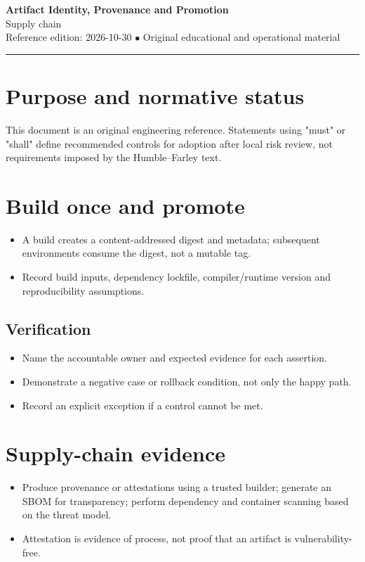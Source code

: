 \documentclass[10pt,letterpaper]{article}
\begin{document}
\begin{center}
{\LARGE\bfseries\color{cdblue}Artifact Identity, Provenance and Promotion}\\[7pt]
{\large Supply chain}\\[6pt]
{\small Reference edition: 2026-10-30 $\bullet$ Original educational and operational material}
\end{center}
\noindent\color{cdblue}\rule{\linewidth}{1.2pt}\color{black}
\vspace{0.4em}
\section{Purpose and normative status}
This document is an original engineering reference. Statements using "must" or "shall" define recommended controls for adoption after local risk review, not requirements imposed by the Humble--Farley text.


\section{Build once and promote}
\begin{itemize}
\item A build creates a content-addressed digest and metadata; subsequent environments consume the digest, not a mutable tag.
\item Record build inputs, dependency lockfile, compiler/runtime version and reproducibility assumptions.
\end{itemize}
\subsection{Verification}
\begin{itemize}
\item Name the accountable owner and expected evidence for each assertion.
\item Demonstrate a negative case or rollback condition, not only the happy path.
\item Record an explicit exception if a control cannot be met.
\end{itemize}


\section{Supply-chain evidence}
\begin{itemize}
\item Produce provenance or attestations using a trusted builder; generate an SBOM for transparency; perform dependency and container scanning based on the threat model.
\item Attestation is evidence of process, not proof that an artifact is vulnerability-free.
\end{itemize}
\end{document}
